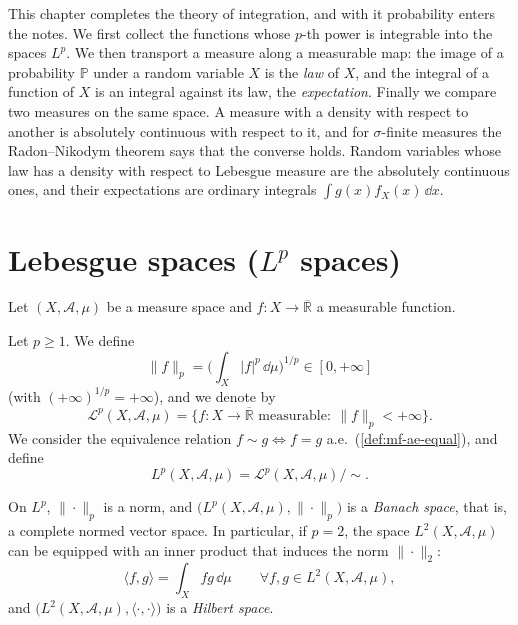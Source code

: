 
This chapter completes the theory of integration, and with it probability enters the notes.
We first collect the functions whose $p$-th power is integrable into the spaces $L^p$. We
then transport a measure along a measurable map: the image of a probability $\mathbb P$ under
a random variable $X$ is the \emph{law} of $X$, and the integral of a function of $X$ is an
integral against its law, the \emph{expectation}. Finally we compare two measures on the same
space. A measure with a density with respect to another is absolutely continuous with respect
to it, and for $\sigma$-finite measures the Radon--Nikodym theorem says that the converse holds.
Random variables whose law
has a density with respect to Lebesgue measure are the absolutely continuous ones, and their
expectations are ordinary integrals $\int g(x)f_X(x)\,\dd x$.

\section{Lebesgue spaces (\texorpdfstring{$L^p$}{Lp} spaces)}\label{sec:ld-Lp}

Let $(X,\mathcal A,\mu)$ be a measure space and $f:X\to\overline{\mathbb R}$ a measurable
function.

\begin{definition}[$L^p$ spaces]\label{def:ld-Lp}
Let $p\ge1$. We define
\[
  \|f\|_p=\Big(\int_X|f|^p\,\dd\mu\Big)^{1/p}\in[0,+\infty]
\]
(with $(+\infty)^{1/p}=+\infty$), and we denote by
\[
  \mathcal L^p(X,\mathcal A,\mu)=\big\{f:X\to\overline{\mathbb R}\text{ measurable}:\ \|f\|_p<+\infty\big\}.
\]
We consider the equivalence relation $f\sim g\iff f=g$ a.e.\ (\cref{def:mf-ae-equal}), and define
\[
  L^p(X,\mathcal A,\mu)=\mathcal L^p(X,\mathcal A,\mu)/\!\sim .
\]
\end{definition}

On $L^p$, $\|\cdot\|_p$ is a norm, and $\big(L^p(X,\mathcal A,\mu),\|\cdot\|_p\big)$ is a
\emph{Banach space}, that is, a complete normed vector space. In particular, if $p=2$, the
space $L^2(X,\mathcal A,\mu)$ can be equipped with an inner product that induces the norm
$\|\cdot\|_2$:
\[
  \langle f,g\rangle=\int_Xfg\,\dd\mu\qquad\forall f,g\in L^2(X,\mathcal A,\mu),
\]
and $\big(L^2(X,\mathcal A,\mu),\langle\cdot,\cdot\rangle\big)$ is a \emph{Hilbert space}.

